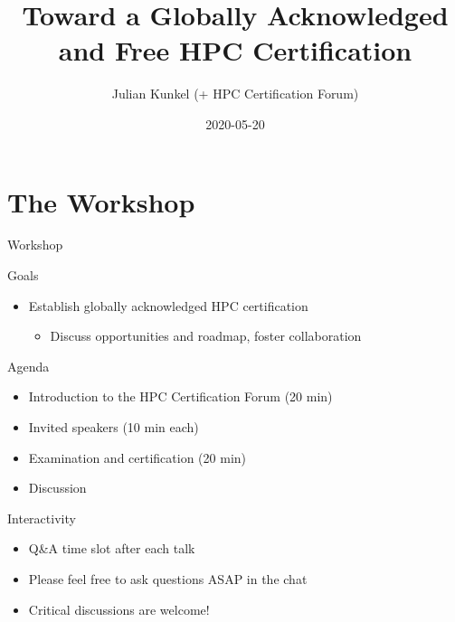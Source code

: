 \documentclass[compress,aspectratio=169]{beamer}
\subtitle{}
\title{\Large Toward a Globally Acknowledged and Free HPC Certification}
\author{Julian Kunkel (+ HPC Certification Forum)}
\date{2020-05-20}
\institute{Department of Computer Science}
\begin{document}
\begin{frame}[plain]{}
	\maketitle
\end{frame}



\section{The Workshop}

\begin{frame}{Workshop}
  \begin{block}{Goals}
    \begin{itemize}
      \item Establish globally acknowledged HPC certification
        \begin{itemize}
          \item Discuss opportunities and roadmap, foster collaboration
        \end{itemize}
    \end{itemize}
  \end{block}

  \vspace*{-0.7em}


  \begin{block}{Agenda}
    \begin{itemize}
      \item Introduction to the HPC Certification Forum (20 min)
      \item Invited speakers (10 min each)
      \item Examination and certification (20 min)
      \item Discussion
    \end{itemize}
  \end{block}

  \vspace*{-0.3em}

  \begin{block}{Interactivity}
    \begin{itemize}
      \item Q\&A time slot after each talk
      \item Please feel free to ask questions ASAP in the chat
      \item Critical discussions are welcome!
    \end{itemize}
  \end{block}

\end{frame}
\end{document}
